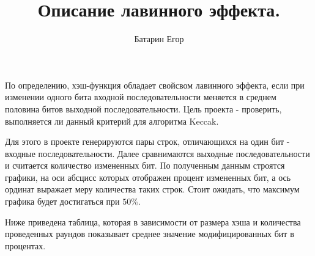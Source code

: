 \documentclass[a4paper,12pt]{article}
\author{Батарин Егор}
\title{Описание лавинного эффекта.}
\date{}
\theoremstyle{plain} %
\theoremstyle{definition} %
\theoremstyle{remark} %
\begin{document}
	
	\maketitle
По определению, хэш-функция обладает свойсвом лавинного эффекта, если при изменении одного бита входной последовательности меняется в среднем половина битов выходной последовательности. Цель проекта - проверить, выполняется ли данный критерий для алгоритма Keccak.

Для этого в проекте генерируются пары строк, отличающихся на один бит - входные последовательности. Далее сравнимаются выходные последовательности и считается количество измененных бит. По полученным данным строятся графики, на оси абсцисс которых отображен процент измененных бит, а ось ординат выражает меру количества таких строк. Стоит ожидать, что максимум графика будет достигаться при $50\%$.

Ниже приведена таблица, которая в зависимости от размера хэша и количества проведенных раундов показывает среднее значение модифицированных бит в процентах.
\end{document}
